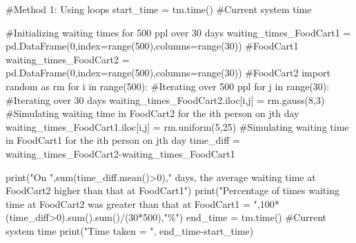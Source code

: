 \documentclass[
  letterpaper,
  DIV=11,
  numbers=noendperiod]{scrreprt}
\newenvironment{Shaded}{\begin{snugshade}}{\end{snugshade}}
\newcommand{\BuiltInTok}[1]{\textcolor[rgb]{0.00,0.23,0.31}{#1}}
\newcommand{\CommentTok}[1]{\textcolor[rgb]{0.37,0.37,0.37}{#1}}
\newcommand{\ControlFlowTok}[1]{\textcolor[rgb]{0.00,0.23,0.31}{#1}}
\newcommand{\DecValTok}[1]{\textcolor[rgb]{0.68,0.00,0.00}{#1}}
\newcommand{\ImportTok}[1]{\textcolor[rgb]{0.00,0.46,0.62}{#1}}
\newcommand{\KeywordTok}[1]{\textcolor[rgb]{0.00,0.23,0.31}{#1}}
\newcommand{\NormalTok}[1]{\textcolor[rgb]{0.00,0.23,0.31}{#1}}
\newcommand{\OperatorTok}[1]{\textcolor[rgb]{0.37,0.37,0.37}{#1}}
\newcommand{\StringTok}[1]{\textcolor[rgb]{0.13,0.47,0.30}{#1}}
\begin{document}
\begin{Shaded}
\begin{Highlighting}[]
\CommentTok{\#Method 1: Using loops}
\NormalTok{start\_time }\OperatorTok{=}\NormalTok{ tm.time() }\CommentTok{\#Current system time}

\CommentTok{\#Initializing waiting times for 500 ppl over 30 days}
\NormalTok{waiting\_times\_FoodCart1 }\OperatorTok{=}\NormalTok{ pd.DataFrame(}\DecValTok{0}\NormalTok{,index}\OperatorTok{=}\BuiltInTok{range}\NormalTok{(}\DecValTok{500}\NormalTok{),columns}\OperatorTok{=}\BuiltInTok{range}\NormalTok{(}\DecValTok{30}\NormalTok{)) }\CommentTok{\#FoodCart1}
\NormalTok{waiting\_times\_FoodCart2 }\OperatorTok{=}\NormalTok{ pd.DataFrame(}\DecValTok{0}\NormalTok{,index}\OperatorTok{=}\BuiltInTok{range}\NormalTok{(}\DecValTok{500}\NormalTok{),columns}\OperatorTok{=}\BuiltInTok{range}\NormalTok{(}\DecValTok{30}\NormalTok{)) }\CommentTok{\#FoodCart2}
\ImportTok{import}\NormalTok{ random }\ImportTok{as}\NormalTok{ rm}
\ControlFlowTok{for}\NormalTok{ i }\KeywordTok{in} \BuiltInTok{range}\NormalTok{(}\DecValTok{500}\NormalTok{):  }\CommentTok{\#Iterating over 500 ppl}
    \ControlFlowTok{for}\NormalTok{ j }\KeywordTok{in} \BuiltInTok{range}\NormalTok{(}\DecValTok{30}\NormalTok{): }\CommentTok{\#Iterating over 30 days}
\NormalTok{        waiting\_times\_FoodCart2.iloc[i,j] }\OperatorTok{=}\NormalTok{ rm.gauss(}\DecValTok{8}\NormalTok{,}\DecValTok{3}\NormalTok{) }\CommentTok{\#Simulating waiting time in FoodCart2 for the ith person on jth day}
\NormalTok{        waiting\_times\_FoodCart1.iloc[i,j] }\OperatorTok{=}\NormalTok{ rm.uniform(}\DecValTok{5}\NormalTok{,}\DecValTok{25}\NormalTok{) }\CommentTok{\#Simulating waiting time in FoodCart1 for the ith person on jth day}
\NormalTok{time\_diff }\OperatorTok{=}\NormalTok{ waiting\_times\_FoodCart2}\OperatorTok{{-}}\NormalTok{waiting\_times\_FoodCart1}

\BuiltInTok{print}\NormalTok{(}\StringTok{"On "}\NormalTok{,}\BuiltInTok{sum}\NormalTok{(time\_diff.mean()}\OperatorTok{\textgreater{}}\DecValTok{0}\NormalTok{),}\StringTok{" days, the average waiting time at FoodCart2 higher than that at FoodCart1"}\NormalTok{)}
\BuiltInTok{print}\NormalTok{(}\StringTok{"Percentage of times waiting time at FoodCart2 was greater than that at FoodCart1 = "}\NormalTok{,}\DecValTok{100}\OperatorTok{*}\NormalTok{(time\_diff}\OperatorTok{\textgreater{}}\DecValTok{0}\NormalTok{).}\BuiltInTok{sum}\NormalTok{().}\BuiltInTok{sum}\NormalTok{()}\OperatorTok{/}\NormalTok{(}\DecValTok{30}\OperatorTok{*}\DecValTok{500}\NormalTok{),}\StringTok{"\%"}\NormalTok{)}
\NormalTok{end\_time }\OperatorTok{=}\NormalTok{ tm.time() }\CommentTok{\#Current system time}
\BuiltInTok{print}\NormalTok{(}\StringTok{"Time taken = "}\NormalTok{, end\_time}\OperatorTok{{-}}\NormalTok{start\_time)}
\end{Highlighting}
\end{Shaded}
\end{document}
